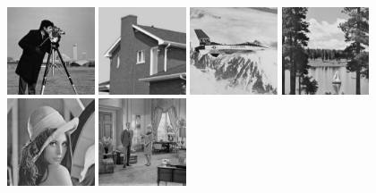 \begin{figure}[hbt]
    \centering
    \includegraphics[width=0.23\textwidth]{fig/testimages/cameraman.png}\hfill
    \includegraphics[width=0.23\textwidth]{fig/testimages/house.png}\hfill
    \includegraphics[width=0.23\textwidth]{fig/testimages/jetplane.png}\hfill
    \includegraphics[width=0.23\textwidth]{fig/testimages/lake.png}\hfill
    \\\textwidth
    \includegraphics[width=0.23\textwidth]{fig/testimages/lena_gray.png}\hfill
    \includegraphics[width=0.23\textwidth]{fig/testimages/livingroom.png}\hfill

\end{figure}
